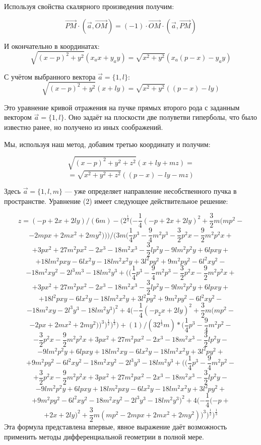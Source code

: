 Используя свойства скалярного произведения получим:

$$\overrightarrow{PM}\cdot(\vec a ,\overrightarrow{OM})=(-1)\cdot\overrightarrow{OM}\cdot(\vec a,\overrightarrow{PM})$$

И  окончательно в координатах:
\[
\sqrt{(x-p)^2+y^2}
\left(x_a x +y_a y\right)
=
\sqrt{x^2+y^2}
\left( x_a (p-x)-y_ay \right)
\]

С учётом выбранного вектора $\vec a = \{ 1,l \}$:
\[
\sqrt{(x-p)^2+y^2}
\left(x+l y\right)
=
\sqrt{x^2+y^2}
\left( (p-x)-l y \right)
\]

Это уравнение кривой отражения на пучке прямых второго рода с заданным вектором $\vec a = \{ 1,l \}$. Оно задаёт на плоскости две полуветви гиперболы, что было известно ранее, но получено из иных соображений.

Мы, используя наш метод, добавим третью координату и получим:

\[
\sqrt{(x-p)^2+y^2+z^2}
\left(x+l y+m z\right)
= \]
\[=
\sqrt{x^2+y^2+z^2}
\left( (p-x)-l y-m z \right)
\]


Здесь $\vec a = \{ 1,l,m\}$ --- уже определяет направление несобственного пучка в пространстве.
Уравнение (2) имеет следующее действительное решение:

$$z=(-p+2x+2ly)/(6m)-(2^\frac{1}{3}(-\frac{1}{4}(-p+2x+2ly)^2 +\frac{3}{2} m(mp^2-$$
$$-2mpx+2mx^2+2my^2)))/(3m(\frac{1}{4}p^3-\frac{9}{4}m^2p^3-\frac{3}{2}p^2x-\frac{9}{2}m^2p^2x+$$
$$+3px^2+27m^2px^2-2x^3-18m^2x^3-\frac{3}{2}lp^2y-9lm^2p^2y+6lpxy+$$
$$+18lm^2pxy-6lx^2y-18lm^2x^2y+3l^2py^2+9m^2py^2-6l^2xy^2-$$
$$-18m^2xy^2-2l^3m^3-18lm^2y^3+((\frac{1}{4}p^3-\frac{9}{4}m^2p^3-\frac{3}{2}p^2x-\frac{9}{2}m^2p^2x+$$
$$+3px^2+27m^2px^2-2x^3-18m^2x^3-\frac{3}{2}lp^2y-9lm^2p^2y+6lpxy+$$
$$+18l^2pxy-6lx^2y-18lm^2x^2y+3l^2py^2+9m^2py^2-6l^2xy^2-$$
$$-18m^2xy-2l^3y^3-18lm^2y^3)^2+4(-\frac{1}{4}(-p_2x+2ly)^2+\frac{3}{2}m(mp^2-$$
$$-2px+2mx^2+2my^2))^3)^\frac{1}{2})^\frac{1}{3}) +
(1)/(32^\frac{1}{3}m) *
(\frac{1}{4}p^3-\frac{9}{4}m^2p^2-$$
$$-\frac{3}{2}p^2x-\frac{9}{2}m^2p^2x+3px^2+27m^2px^2-2x^3-18m^2x^3-\frac{3}{2}lp^2y-$$
$$-9lm^2p^2y+6lpxy+18lm^2xy-6lx^2y-18lm^2x^2y+3l^2py^2+$$
$$+9m^2py^2-6l^2xy^2-18m^2xy^2-2l^3y^3-18lm^2y^3+((\frac{1}{4}p^3-\frac{9}{4}m^2p^2-$$
$$+\frac{3}{2}p^2x-\frac{9}{2}m^2p^2x+3px^2+27m^2px^2-2x^3-18m^2x^3-\frac{3}{2}lp^2y-$$
$$-9lm^2p^2y+6lpxy+18lm^2pxy-6lx^2y-18lm^2x^2y+3l^2py^2+$$
$$+9m^2py^2-6l^2xy^2-18m^2xy^2-2l^3y^3-18lm^2y^3)^2+4(-\frac{1}{4}(-p+$$
$$+2x+2ly)^2+\frac{3}{2}m(mp^2-2mpx+2mx^2+2my^2))^3)^\frac{1}{2})^\frac{1}{3}$$
Эта формула представлена впервые, явное выражение даёт возможность применить методы дифференциальной геометрии в полной мере.

